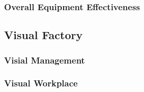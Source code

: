 \documentclass[]{article}
\begin{document}
\subsubsection{Overall Equipment Effectiveness}

\subsection{Visual Factory}

\subsubsection{Visial Management}

\subsubsection{Visual Workplace}



\end{document}
